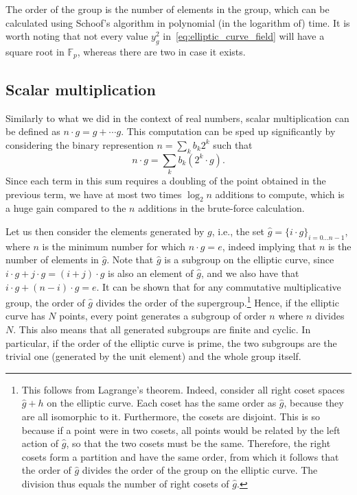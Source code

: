 \documentclass{article}
\begin{document}
The order of the group is the number of elements in the group, which can be
calculated using Schoof's algorithm in polynomial (in the logarithm of) time.
It is worth noting that not every value $y_g^2$
in~\eqref{eq:elliptic_curve_field} will have a square root in $\mathbb{F}_p$,
whereas there are two in case it exists.

\subsection{Scalar multiplication}

Similarly to what we did in the context of real numbers, scalar multiplication
can be defined as $n \cdot g = g + \cdots g$. This computation can be sped up
significantly by considering the binary represention $n = \sum_k b_k 2^k$ such
that
\begin{equation}
    n \cdot g = \sum_k b_k (2^k \cdot g).
\end{equation}
Since each term in this sum requires a doubling of the point obtained in the
previous term, we have at most two times $\log_2 n$ additions to compute, which
is a huge gain compared to the $n$ additions in the brute-force calculation.

Let us then consider the elements generated by $g$, i.e., the set $\hat{g} = \{i
\cdot g\}_{i = 0 \ldots n - 1}$, where $n$ is the minimum number for which $n
\cdot g = e$, indeed implying that $n$ is the number of elements in $\hat{g}$.
Note that $\hat{g}$ is a subgroup on the elliptic curve, since $i \cdot g + j
\cdot g = (i + j) \cdot g$ is also an element of $\hat{g}$, and we also have
that $i \cdot g + (n - i) \cdot g = e$. It can be shown that for any commutative
multiplicative group, the order of $\hat{g}$ divides the order of the
supergroup.\footnote{ This follows from Lagrange's theorem. Indeed, consider all
right coset spaces $\hat{g} + h$ on the elliptic curve. Each coset has the same
order as $\hat{g}$, because they are all isomorphic to it. Furthermore, the
cosets are disjoint. This is so because if a point were in two cosets, all
points would be related by the left action of $\hat{g}$, so that the two cosets
must be the same. Therefore, the right cosets form a partition and have the same
order, from which it follows that the order of $\hat{g}$ divides the order of
the group on the elliptic curve. The division thus equals the number of right
cosets of $\hat{g}$.} Hence, if the elliptic curve has $N$ points, every point
generates a subgroup of order $n$ where $n$ divides $N$. This also means that
all generated subgroups are finite and cyclic. In particular, if the order of
the elliptic curve is prime, the two subgroups are the trivial one (generated by
the unit element) and the whole group itself.
\end{document}
